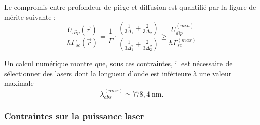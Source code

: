 Le compromis entre profondeur de piège et diffusion est quantifié par la figure de mérite suivante :
\begin{equation}
\frac{U_{dip}(\vec{r})}{\hbar \Gamma_{sc}(\vec{r})} = \frac{1}{\Gamma} \cdot \frac{ \left( \frac{1}{3\Delta_1} + \frac{2}{3\Delta_2} \right)}{\left( \frac{1}{3\Delta_1^2} + \frac{2}{3\Delta_2^2} \right)} \geq \frac{U_{dip}^{(min)}}{\hbar \Gamma_{sc}^{(max)}}
\end{equation}

Un calcul numérique montre que, sous ces contraintes, il est nécessaire de sélectionner des lasers dont la longueur d’onde est inférieure à une valeur maximale 
\[
\lambda^{(max)}_{abs} \simeq  778{,}4~\text{nm}.
\]



\subsubsection*{Contraintes sur la puissance laser}



